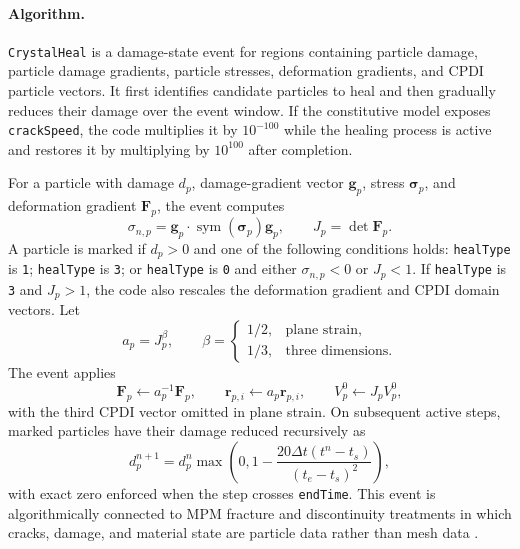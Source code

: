 \paragraph{Algorithm.}
\texttt{CrystalHeal} is a damage-state event for regions containing particle damage, particle damage gradients, particle stresses, deformation gradients, and CPDI particle vectors.  It first identifies candidate particles to heal and then gradually reduces their damage over the event window.  If the constitutive model exposes \texttt{crackSpeed}, the code multiplies it by $10^{-100}$ while the healing process is active and restores it by multiplying by $10^{100}$ after completion.

For a particle with damage $d_p$, damage-gradient vector $\mathbf{g}_p$, stress $\boldsymbol{\sigma}_p$, and deformation gradient $\mathbf{F}_p$, the event computes
\begin{equation}
  \sigma_{n,p} = \mathbf{g}_p\cdot\operatorname{sym}(\boldsymbol{\sigma}_p)\mathbf{g}_p,
  \qquad J_p = \det\mathbf{F}_p.
  \label{eq:crystal-heal-indicators}
\end{equation}
A particle is marked if $d_p>0$ and one of the following conditions holds: \texttt{healType} is \texttt{1}; \texttt{healType} is \texttt{3}; or \texttt{healType} is \texttt{0} and either $\sigma_{n,p}<0$ or $J_p<1$.  If \texttt{healType} is \texttt{3} and $J_p>1$, the code also rescales the deformation gradient and CPDI domain vectors.  Let
\begin{equation}
  a_p = J_p^\beta,
  \qquad
  \beta=\begin{cases}1/2, & \text{plane strain},\\1/3, & \text{three dimensions}.
  \end{cases}
\end{equation}
The event applies
\begin{equation}
  \mathbf{F}_p \leftarrow a_p^{-1}\mathbf{F}_p,
  \qquad
  \mathbf{r}_{p,i}\leftarrow a_p\mathbf{r}_{p,i},
  \qquad
  V^0_p \leftarrow J_p V^0_p,
  \label{eq:crystal-heal-volume-scaling}
\end{equation}
with the third CPDI vector omitted in plane strain.  On subsequent active steps, marked particles have their damage reduced recursively as
\begin{equation}
  d_p^{n+1}=d_p^n\max\left(0,1-\dfrac{20\Delta t(t^n-t_s)}{(t_e-t_s)^2}\right),
  \label{eq:crystal-heal-damage-decay}
\end{equation}
with exact zero enforced when the step crosses \texttt{endTime}.  This event is algorithmically connected to MPM fracture and discontinuity treatments in which cracks, damage, and material state are particle data rather than mesh data \cite{nairn2003cramp,homel2016dfg,homel2016domaindef}.

